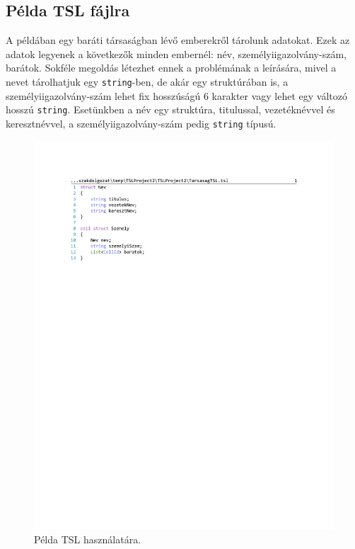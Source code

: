 \subsection{Példa TSL fájlra}

A példában egy baráti társaságban lévő emberekről tárolunk adatokat. Ezek az adatok legyenek a következők minden embernél: név, személyiigazolvány-szám, barátok. Sokféle megoldás létezhet ennek a problémának a leírására, mivel a nevet tárolhatjuk egy \texttt{string}-ben, de akár egy struktúrában is, a személyiigazolvány-szám lehet fix hosszúságú 6 karakter vagy lehet egy változó hosszú \texttt{string}. Esetünkben a név egy struktúra, titulussal, vezetéknévvel és keresztnévvel, a  személyiigazolvány-szám pedig \texttt{string} típusú.

\begin{figure}[H]
	\centering
	\includegraphics[]{figures/TarsasagTSL.pdf}
	\caption{Példa TSL használatára.}
	\label{fig:TSL}
\end{figure}

